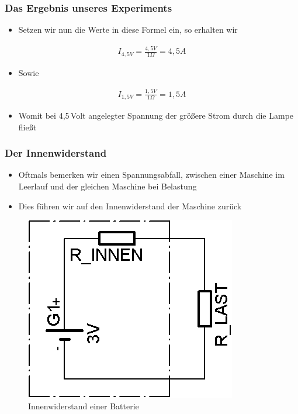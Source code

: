 \begin{frame}
  \frametitle{Das Ergebnis unseres Experiments}
  \begin{itemize}
    \item Setzen wir nun die Werte in diese Formel ein, so erhalten wir
  \end{itemize}
  \begin{align}
    I_{4,5 V} = \frac{4,5 V}{1 \Omega} = 4,5 A
  \end{align}
  \begin{itemize}
    \item Sowie
  \end{itemize}
  \begin{align}
    I_{1,5 V} = \frac{1,5 V}{1 \Omega} = 1,5 A
  \end{align}
  \begin{itemize}
    \item Womit bei 4,5\,Volt angelegter Spannung der größere Strom durch die Lampe fließt
  \end{itemize}
\end{frame}

\begin{frame}
  \frametitle{Der Innenwiderstand}
  \begin{itemize}
    \item Oftmals bemerken wir einen Spannungsabfall, zwischen einer Maschine im Leerlauf und der gleichen Maschine bei Belastung
    \item Dies führen wir auf den Innenwiderstand der Maschine zurück
  \end{itemize}
  \begin{center}
    \begin{figure}
      \includegraphics[scale=1.4]{e03/Innenwiderstand.png}
      \caption{Innenwiderstand einer Batterie}
    \end{figure}
  \end{center}
\end{frame}

